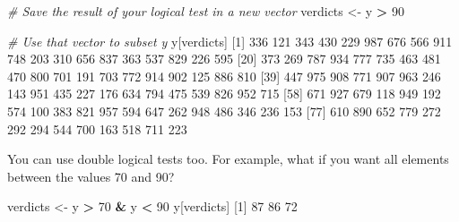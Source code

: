 \documentclass[
]{book}
\newenvironment{Shaded}{\begin{snugshade}}{\end{snugshade}}
\newcommand{\CommentTok}[1]{\textcolor[rgb]{0.56,0.35,0.01}{\textit{#1}}}
\newcommand{\DecValTok}[1]{\textcolor[rgb]{0.00,0.00,0.81}{#1}}
\newcommand{\NormalTok}[1]{#1}
\newcommand{\OtherTok}[1]{\textcolor[rgb]{0.56,0.35,0.01}{#1}}
\newcommand{\SpecialCharTok}[1]{\textcolor[rgb]{0.81,0.36,0.00}{\textbf{#1}}}
\begin{document}
\begin{Shaded}
\begin{Highlighting}[]
\CommentTok{\# Save the result of your logical test in a new vector}
\NormalTok{verdicts }\OtherTok{\textless{}{-}}\NormalTok{ y }\SpecialCharTok{\textgreater{}} \DecValTok{90}

\CommentTok{\# Use that vector to subset y}
\NormalTok{y[verdicts]}
\NormalTok{ [}\DecValTok{1}\NormalTok{] }\DecValTok{336} \DecValTok{121} \DecValTok{343} \DecValTok{430} \DecValTok{229} \DecValTok{987} \DecValTok{676} \DecValTok{566} \DecValTok{911} \DecValTok{748} \DecValTok{203} \DecValTok{310} \DecValTok{656} \DecValTok{837} \DecValTok{363} \DecValTok{537} \DecValTok{829} \DecValTok{226} \DecValTok{595}
\NormalTok{[}\DecValTok{20}\NormalTok{] }\DecValTok{373} \DecValTok{269} \DecValTok{787} \DecValTok{934} \DecValTok{777} \DecValTok{735} \DecValTok{463} \DecValTok{481} \DecValTok{470} \DecValTok{800} \DecValTok{701} \DecValTok{191} \DecValTok{703} \DecValTok{772} \DecValTok{914} \DecValTok{902} \DecValTok{125} \DecValTok{886} \DecValTok{810}
\NormalTok{[}\DecValTok{39}\NormalTok{] }\DecValTok{447} \DecValTok{975} \DecValTok{908} \DecValTok{771} \DecValTok{907} \DecValTok{963} \DecValTok{246} \DecValTok{143} \DecValTok{951} \DecValTok{435} \DecValTok{227} \DecValTok{176} \DecValTok{634} \DecValTok{794} \DecValTok{475} \DecValTok{539} \DecValTok{826} \DecValTok{952} \DecValTok{715}
\NormalTok{[}\DecValTok{58}\NormalTok{] }\DecValTok{671} \DecValTok{927} \DecValTok{679} \DecValTok{118} \DecValTok{949} \DecValTok{192} \DecValTok{574} \DecValTok{100} \DecValTok{383} \DecValTok{821} \DecValTok{957} \DecValTok{594} \DecValTok{647} \DecValTok{262} \DecValTok{948} \DecValTok{486} \DecValTok{346} \DecValTok{236} \DecValTok{153}
\NormalTok{[}\DecValTok{77}\NormalTok{] }\DecValTok{610} \DecValTok{890} \DecValTok{652} \DecValTok{779} \DecValTok{272} \DecValTok{292} \DecValTok{294} \DecValTok{544} \DecValTok{700} \DecValTok{163} \DecValTok{518} \DecValTok{711} \DecValTok{223}
\end{Highlighting}
\end{Shaded}

You can use double logical tests too. For example, what if you want all elements between the values 70 and 90?

\begin{Shaded}
\begin{Highlighting}[]
\NormalTok{verdicts }\OtherTok{\textless{}{-}}\NormalTok{ y }\SpecialCharTok{\textgreater{}} \DecValTok{70} \SpecialCharTok{\&}\NormalTok{ y }\SpecialCharTok{\textless{}} \DecValTok{90}
\NormalTok{y[verdicts]}
\NormalTok{[}\DecValTok{1}\NormalTok{] }\DecValTok{87} \DecValTok{86} \DecValTok{72}
\end{Highlighting}
\end{Shaded}
\end{document}
